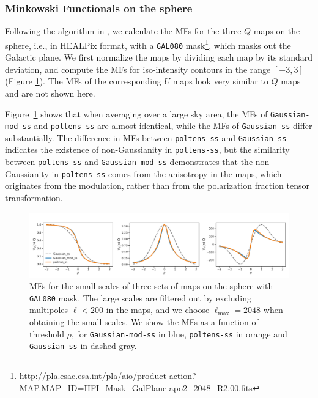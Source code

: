 \documentclass[twocolumn]{aastex631}
\begin{document}
\subsubsection{Minkowski Functionals on the sphere}

Following the algorithm in \cite{Grewal:2022}, we calculate the MFs for the three $Q$ maps on the sphere, i.e., in HEALPix format, with a \texttt{GAL080} mask\footnote{\url{http://pla.esac.esa.int/pla/aio/product-action?MAP.MAP_ID=HFI_Mask_GalPlane-apo2_2048_R2.00.fits}}, which masks out the Galactic plane. We first normalize the maps by dividing each map by its standard deviation, and compute the MFs for iso-intensity contours in the range $[-3, 3]$ (Figure \ref{fig:MF:sphere}).  
The MFs of the corresponding $U$ maps look very similar to $Q$ maps and are not shown here.

Figure~\ref{fig:MF:sphere} shows that when averaging over a large sky area, the MFs of \texttt{Gaussian-mod-ss} and \texttt{poltens-ss} are almost identical, while the MFs of \texttt{Gaussian-ss} differ substantially. The difference in MFs between \texttt{poltens-ss} and \texttt{Gaussian-ss} indicates the existence of non-Gaussianity in \texttt{poltens-ss}, but the similarity between \texttt{poltens-ss} and \texttt{Gaussian-mod-ss} demonstrates that the non-Gaussianity in \texttt{poltens-ss} comes from the anisotropy in the maps, which originates from the modulation, rather than from the polarization fraction tensor transformation.

\begin{figure}
    \centering
    \includegraphics[width=180mm]{figures/MFs_80p_sky_Q.pdf}
    \caption{MFs for the small scales of three sets of maps on the sphere with \texttt{GAL080} mask. The large scales are filtered out by excluding multipoles $\ell < 200$ in the maps, and we choose $\ell_\text{max} = 2048$ when obtaining the small scales. We show the MFs as a function of threshold $\rho$, for \texttt{Gaussian-mod-ss} in blue, \texttt{poltens-ss} in orange and \texttt{Gaussian-ss} in dashed gray.}
    \label{fig:MF:sphere}
\end{figure}
\end{document}
